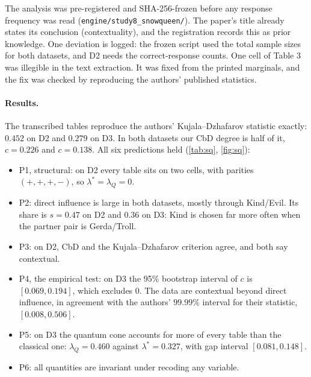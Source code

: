 \documentclass[11pt]{article}
\theoremstyle{definition}\newtheorem{definition}[theorem]{Definition}\newtheorem{remark}[theorem]{Remark}\newtheorem{example}[theorem]{Example}
\begin{document}
The analysis was pre-registered and SHA-256-frozen before any response frequency was read (\texttt{engine/study8\_snowqueen/}). The
paper's title already states its conclusion (contextuality), and the registration records this as prior knowledge. One deviation is
logged: the frozen script used the total sample sizes for both datasets, and D2 needs the correct-response counts. One cell of Table 3
was illegible in the text extraction. It was fixed from the printed marginals, and the fix was checked by reproducing the authors' published
statistics.

\paragraph{Results.}
The transcribed tables reproduce the authors' Kujala--Dzhafarov statistic exactly: $0.452$ on D2 and $0.279$ on D3. In both datasets our
CbD degree is half of it, $c=0.226$ and $c=0.138$. All six predictions held (\cref{tab:sq}, \cref{fig:sq}):
\begin{itemize}
\item P1, structural: on D2 every table sits on two cells, with parities $(+,+,+,-)$, so $\lambda^*=\lambda_Q=0$.
\item P2: direct influence is large in both datasets, mostly through Kind/Evil. Its share is $s=0.47$ on D2 and $0.36$ on D3: Kind is chosen
far more often when the partner pair is Gerda/Troll.
\item P3: on D2, CbD and the Kujala--Dzhafarov criterion agree, and both say contextual.
\item P4, the empirical test: on D3 the 95\% bootstrap interval of $c$ is $[0.069,0.194]$, which excludes $0$. The data are contextual beyond
direct influence, in agreement with the authors' $99.99\%$ interval for their statistic, $[0.008,0.506]$.
\item P5: on D3 the quantum cone accounts for more of every table than the classical one: $\lambda_Q=0.460$ against $\lambda^*=0.327$, with
gap interval $[0.081,0.148]$.
\item P6: all quantities are invariant under recoding any variable.
\end{itemize}
\end{document}

